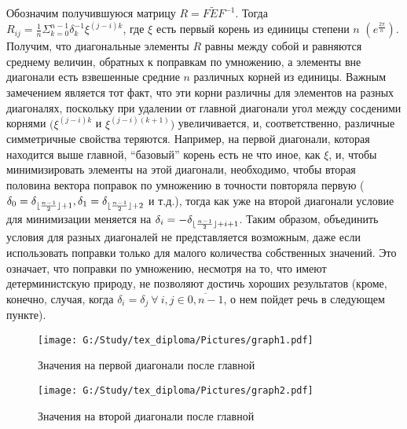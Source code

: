 \documentclass[a4paper]{article}
\DeclarePairedDelimiter\floor{\lfloor}{\rfloor}
\theoremstyle{definition}
\begin{document}
    Обозначим получившуюся матрицу $R = F\tilde{E}F^{-1}$. Тогда\\$R_{ij} = \frac{1}{n}\Sigma_{k=0}^{n-1} \delta_k^{-1} \xi^{(j-i)k}$, где $\xi$ есть первый корень из единицы степени $n$  $(e^{\frac{2\pi}{n}})$. Получим, что диагональные элементы $R$ равны между собой и равняются среднему величин, обратных к поправкам по умножению, а элементы вне диагонали есть взвешенные средние $n$ различных корней из единицы. Важным замечением является тот факт, что эти корни различны для элементов на разных диагоналях, поскольку при удалении от главной диагонали угол между сосденими корнями $(\xi^{(j-i)k}$ и $\xi^{(j-i)(k+1)})$ увеличивается, и, соответственно, различные симметричные свойства теряются. Например, на первой диагонали, которая находится выше главной, ``базовый'' корень есть не что иное, как $\xi$, и, чтобы минимизировать элементы на этой диагонали, необходимо, чтобы вторая половина вектора поправок по умножению в точности повторяла первую ($\delta_0 = \delta_{\floor{\frac{n-1}{2}}+1}, \delta_1 = \delta_{\floor{\frac{n-1}{2}}+2}$ и т.д.), тогда как уже на второй диагонали условие для минимизации меняется на $\delta_i = -\delta_{\floor{\frac{n-1}{2}}+i+1}$. Таким образом, объединить условия для разных диагоналей не представляется возможным, даже если использовать поправки только для малого количества собственных значений. Это означает, что поправки по умножению, несмотря на то, что имеют детерминистскую природу, не позволяют достичь хороших результатов (кроме, конечно, случая, когда $\delta_i = \delta_j~ \forall~ i, j\in \overline{0, n-1}$, о нем пойдет речь в следующем пункте).


\hspace*{-\parindent}
\begin{minipage}{80mm}
    \begin{figure}[H]
            \texttt{[image: G:/Study/tex\_diploma/Pictures/graph1.pdf]}
            \label{Graph1}
            \caption[Значения на первой диагонали после главной]{Значения на первой диагонали после главной}
        \end{figure}
\end{minipage}
\begin{minipage}{80mm}
  \begin{figure}[H]
            \texttt{[image: G:/Study/tex\_diploma/Pictures/graph2.pdf]}
            \label{Graph2}
            \caption[Значения на второй диагонали после главной]{Значения на второй диагонали после главной}
        \end{figure}
\end{minipage}
\hfill
\vspace*{2mm}
\end{document}
